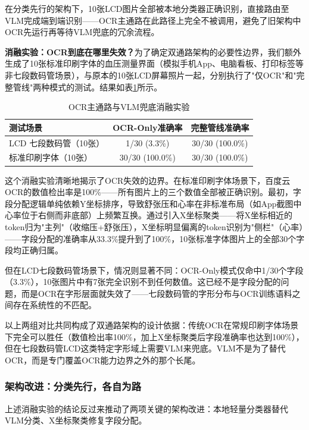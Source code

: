\documentclass[zihao=-4,a4paper]{ctexart}
\begin{document}
在分类先行的架构下，10张LCD图片全部被本地分类器正确识别，直接路由至VLM完成端到端识别——OCR主通路在此路径上完全不被调用，避免了旧架构中OCR先运行再等待VLM兜底的冗余流程。

\textbf{消融实验：OCR到底在哪里失效？}为了确定双通路架构的必要性边界，我们额外生成了10张标准印刷字体的血压测量界面（模拟手机App、电脑看板、打印标签等非七段数码管场景），与原本的10张LCD屏幕照片一起，分别执行了"仅OCR"和"完整管线"两种模式的测试。结果如表\ref{tab:ocr-ablation}所示。

\begin{table}[H]
\centering
\caption{OCR主通路与VLM兜底消融实验}
\label{tab:ocr-ablation}
\begin{tabular}{lcc}
\toprule
\textbf{测试场景} & \textbf{OCR-Only准确率} & \textbf{完整管线准确率} \\
\midrule
LCD 七段数码管（10张） & 1/30 (3.3\%) & 30/30 (100.0\%) \\
标准印刷字体（10张） & 30/30 (100.0\%) & 30/30 (100.0\%) \\
\bottomrule
\end{tabular}
\end{table}

这个消融实验清晰地揭示了OCR失效的边界。在标准印刷字体场景下，百度云OCR的数值检出率是100\%——所有图片上的三个数值全部被正确识别。最初，字段分配逻辑单纯依赖Y坐标排序，导致舒张压和心率在非标准布局（如App截图中心率位于右侧而非底部）上频繁互换。通过引入X坐标聚类——将X坐标相近的token归为"主列"（收缩压+舒张压），X坐标明显偏离的token识别为"侧栏"（心率）——字段分配的准确率从33.3\%提升到了100\%，10张标准字体图片上的全部30个字段均正确归属。

但在LCD七段数码管场景下，情况则显著不同：OCR-Only模式仅命中1/30个字段（3.3\%），10张图片中有7张完全识别不到任何数值。这已经不是字段分配的问题，而是OCR在字形层面就失效了——七段数码管的字形分布与OCR训练语料之间存在系统性的不匹配。

以上两组对比共同构成了双通路架构的设计依据：传统OCR在常规印刷字体场景下完全可以胜任（数值检出率100\%，加上X坐标聚类后字段准确率也达到100\%），但在七段数码管LCD这类特定字形域上需要VLM来兜底。VLM不是为了替代OCR，而是专门覆盖OCR能力边界之外的那个长尾。

\subsubsection{架构改进：分类先行，各自为路}

上述消融实验的结论反过来推动了两项关键的架构改进：本地轻量分类器替代VLM分类、X坐标聚类修复字段分配。
\end{document}
